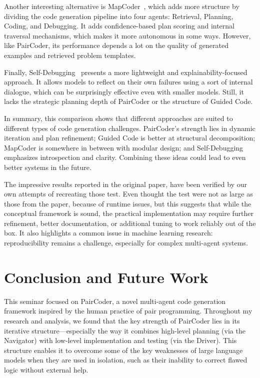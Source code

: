 \documentclass[11pt,a4paper]{article}
\begin{document}
Another interesting alternative is MapCoder~\cite{islam2024mapcodermultiagentcodegeneration}, which adds more structure by dividing the code generation pipeline into four agents: Retrieval, Planning, Coding, and Debugging. It adds confidence-based plan scoring and internal traversal mechanisms, which makes it more autonomous in some ways. However, like PairCoder, its performance depends a lot on the quality of generated examples and retrieved problem templates.

Finally, Self-Debugging~\cite{chen2024selfdebugging} presents a more lightweight and explainability-focused approach. It allows models to reflect on their own failures using a sort of internal dialogue, which can be surprisingly effective even with smaller models. Still, it lacks the strategic planning depth of PairCoder or the structure of Guided Code.

In summary, this comparison shows that different approaches are suited to different types of code generation challenges. PairCoder’s strength lies in dynamic iteration and plan refinement; Guided Code is better at structural decomposition; MapCoder is somewhere in between with modular design; and Self-Debugging emphasizes introspection and clarity. Combining these ideas could lead to even better systems in the future.

The impressive results reported in the original paper, have been verified by our own attempts of recreating those test. Even thought the test were not as large as those from the paper, because of runtime issues, but this suggests that while the conceptual framework is sound, the practical implementation may require further refinement, better documentation, or additional tuning to work reliably out of the box. It also highlights a common issue in machine learning research: reproducibility remains a challenge, especially for complex multi-agent systems.


\section{Conclusion and Future Work}

This seminar focused on PairCoder, a novel multi-agent code generation framework inspired by the human practice of pair programming. Throughout my research and analysis, we found that the key strength of PairCoder lies in its iterative structure—especially the way it combines high-level planning (via the Navigator) with low-level implementation and testing (via the Driver). This structure enables it to overcome some of the key weaknesses of large language models when they are used in isolation, such as their inability to correct flawed logic without external help.
\end{document}
